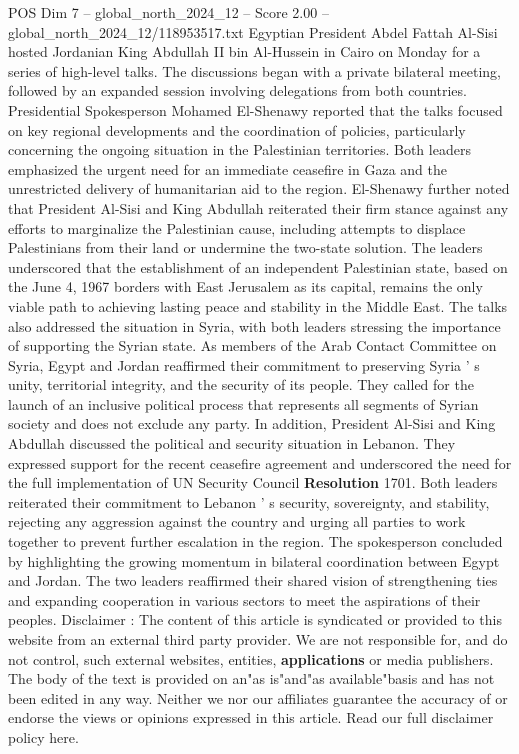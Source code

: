 \begin{textsample}{POS Dim 7 – global\_north\_2024\_12 – Score 2.00 – global\_north\_2024\_12/118953517.txt}  \label{ex:f7_pos_297}
Egyptian President Abdel Fattah Al-Sisi hosted Jordanian King Abdullah II bin Al-Hussein in Cairo on Monday for a series of high-level talks.
The discussions began with a private bilateral meeting, followed by an expanded session involving delegations from both countries.
Presidential Spokesperson Mohamed El-Shenawy reported that the talks focused on key regional developments and the coordination of policies, particularly concerning the ongoing situation in the Palestinian territories.
Both leaders emphasized the urgent need for an immediate ceasefire in Gaza and the unrestricted delivery of humanitarian aid to the region.
El-Shenawy further noted that President Al-Sisi and King Abdullah reiterated their firm stance against any efforts to marginalize the Palestinian cause, including attempts to displace Palestinians from their land or undermine the two-state solution.
The leaders underscored that the establishment of an independent Palestinian state, based on the June 4, 1967 borders with East Jerusalem as its capital, remains the only viable path to achieving lasting peace and stability in the Middle East.
The talks also addressed the situation in Syria, with both leaders stressing the importance of supporting the Syrian state.
As members of the Arab Contact Committee on Syria, Egypt and Jordan reaffirmed their commitment to preserving Syria ' s unity, territorial integrity, and the security of its people.
They called for the launch of an inclusive political process that represents all segments of Syrian society and does not exclude any party.
In addition, President Al-Sisi and King Abdullah discussed the political and security situation in Lebanon.
They expressed support for the recent ceasefire agreement and underscored the need for the full implementation of UN Security Council \textbf{Resolution} 1701.
Both leaders reiterated their commitment to Lebanon ' s security, sovereignty, and stability, rejecting any aggression against the country and urging all parties to work together to prevent further escalation in the region.
The spokesperson concluded by highlighting the growing momentum in bilateral coordination between Egypt and Jordan.
The two leaders reaffirmed their shared vision of strengthening ties and expanding cooperation in various sectors to meet the aspirations of their peoples.
Disclaimer : The content of this article is syndicated or provided to this website from an external third party provider.
We are not responsible for, and do not control, such external websites, entities, \textbf{applications} or media publishers.
The body of the text is provided on an"as is"and"as available"basis and has not been edited in any way.
Neither we nor our affiliates guarantee the accuracy of or endorse the views or opinions expressed in this article.
Read our full disclaimer policy here.

\end{textsample}
